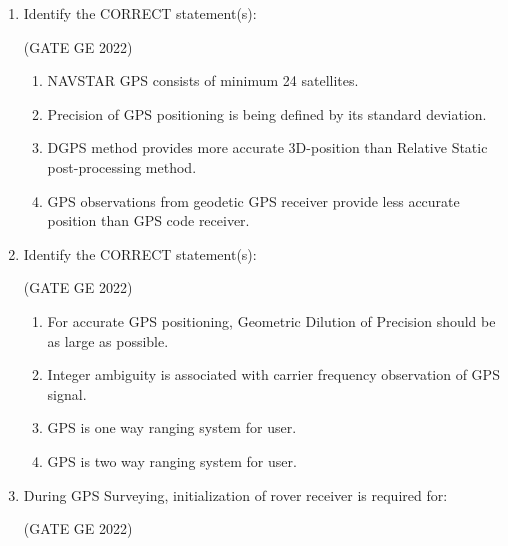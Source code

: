 \documentclass[journal,12pt,onecolumn]{IEEEtran}
\theoremstyle{remark}
\begin{document}
\begin{enumerate}
\begin{enumerate}
\end{enumerate}

\item Identify the CORRECT statement(s):

\hfill (GATE GE 2022)

\begin{enumerate}
    \item NAVSTAR GPS consists of minimum 24 satellites.
    \item Precision of GPS positioning is being defined by its standard deviation.
    \item DGPS method provides more accurate 3D-position than Relative Static post-processing method.
    \item GPS observations from geodetic GPS receiver provide less accurate position than GPS code receiver.
\end{enumerate}

\item Identify the CORRECT statement(s):

\hfill (GATE GE 2022)

\begin{enumerate}
    \item For accurate GPS positioning, Geometric Dilution of Precision should be as large as possible.
    \item Integer ambiguity is associated with carrier frequency observation of GPS signal.
    \item GPS is one way ranging system for user.
    \item GPS is two way ranging system for user.
\end{enumerate}

\item During GPS Surveying, initialization of rover receiver is required for:

\hfill (GATE GE 2022)

\begin{enumerate}
\end{enumerate}


\end{enumerate}
\end{document}
